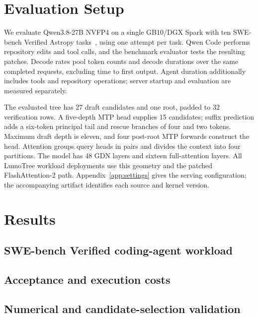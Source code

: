 \documentclass[conference]{IEEEtran}
\newcommand{\sys}{LumoTree}
\begin{document}
\section{Evaluation Setup}
\label{sec:protocol}
We evaluate Qwen3.8-27B NVFP4 on a single GB10/DGX Spark with ten SWE-bench Verified Astropy tasks~\cite{jimenez2024swe}, using one attempt per task. Qwen Code performs repository edits and tool calls, and the benchmark evaluator tests the resulting patches. Decode rates pool token counts and decode durations over the same completed requests, excluding time to first output. Agent duration additionally includes tools and repository operations; server startup and evaluation are measured separately.

The evaluated tree has 27 draft candidates and one root, padded to 32 verification rows. A five-depth MTP head supplies 15 candidates; suffix prediction adds a six-token principal tail and rescue branches of four and two tokens. Maximum draft depth is eleven, and four post-root MTP forwards construct the head. Attention groups query heads in pairs and divides the context into four partitions. The model has 48 GDN layers and sixteen full-attention layers. All \sys{} workload deployments use this geometry and the patched FlashAttention-2 path. Appendix~\ref{app:settings} gives the serving configuration; the accompanying artifact identifies each source and kernel version.

\section{Results}
\label{sec:results}
\subsection{SWE-bench Verified coding-agent workload}
\label{sec:agent-workload}


\subsection{Acceptance and execution costs}


\subsection{Numerical and candidate-selection validation}
\label{sec:current-validation}


\end{document}
